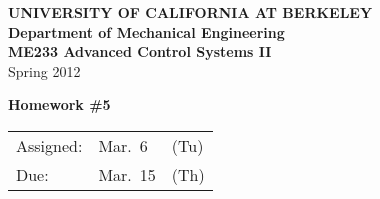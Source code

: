 \documentclass[letterpaper,12pt]{article}
\begin{document}
\begin{center}
    {\bf UNIVERSITY OF CALIFORNIA AT BERKELEY}\\
    {\bf Department of Mechanical Engineering}\\
    {\bf ME233 Advanced Control Systems II}\\
    Spring 2012 \\
\end{center}
\noindent
{\Large \bf Homework \#5 }\\[-3em]
\begin{flushright}
\begin{tabular} {lll}
    Assigned: &  Mar.\ 6 & (Tu) \\
    Due: & Mar.\ 15 & (Th)
\end{tabular}
\end{flushright}

\begin{enumerate}








\end{enumerate}
\end{document}
